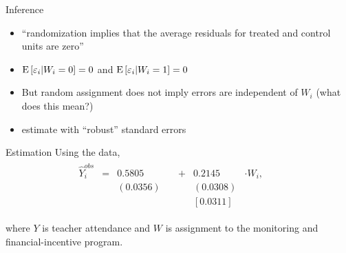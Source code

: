 \documentclass[xcolor={dvipsnames},handout]{beamer}
\begin{document}

\begin{frame}{Inference}

\begin{itemize}
\item ``randomization implies that the average residuals for treated and control units are zero''
\item ${\textrm E}\,[\varepsilon_i \rvert W_i = 0] = 0$ and ${\textrm E}\,[\varepsilon_i \rvert W_i = 1] = 0$
\item But random assignment does not imply errors are independent of $W_i$  (what does this mean?)  
\item[$\rightarrow$] estimate with ``robust'' standard errors 
\end{itemize}

\end{frame}



\begin{frame}{Estimation}
Using the \cite{duflo2012incentives} data,
\begin{gather}
\begin{aligned}
\hat Y_{i}^{obs} & = & 0.5805 & \quad + & 0.2145 & \cdot W_i,&&\\
& & (0.0356) & & (0.0308) \\
& & & &  [0.0311]\nonumber
\end{aligned}
\end{gather}

where $Y$ is teacher attendance and $W$ is assignment to the monitoring and financial-incentive program.

\end{frame}
\end{document}
